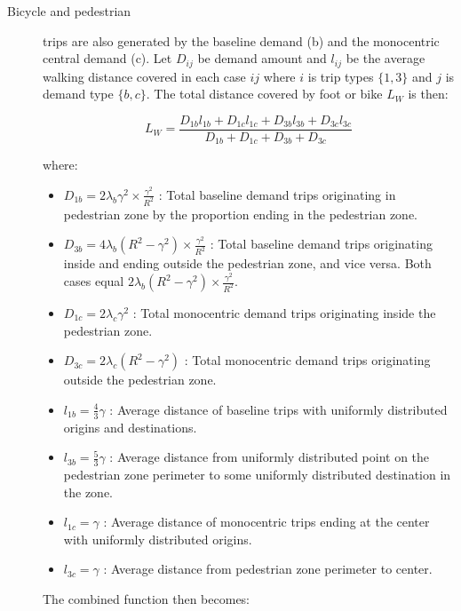 \documentclass{article}
\begin{document}
\begin{description}
    \item [Bicycle and pedestrian] trips are also generated by the baseline demand (b) and the monocentric central demand (c). Let $D_{ij}$ be demand amount and $l_{ij}$ be the average walking distance covered in each case $ij$ where $i$ is trip types $\{1,3\}$ and $j$ is demand type $\{b,c\}$. The total distance covered by foot or bike $L_W$ is then:

\begin{equation}
     L_W = \frac{ D_{1b}l_{1b} + D_{1c}l_{1c} + D_{3b}l_{3b} + D_{3c}l_{3c} } { D_{1b} + D_{1c} + D_{3b} + D_{3c} }
\end{equation}

where: 
\begin{itemize}
    \item $D_{1b} = 2 \lambda_b \gamma^2 \times \frac{\gamma^2}{R^2}$ : Total baseline demand trips originating in pedestrian zone by the proportion ending in the pedestrian zone.
    \item $D_{3b} = 4 \lambda_b (R^2 - \gamma^2) \times \frac{\gamma^2}{R^2}$ : Total baseline demand trips originating inside and ending outside the pedestrian zone, and vice versa. Both cases equal $2\lambda_b (R^2 - \gamma^2) \times \frac{\gamma^2}{R^2}$.
    \item $D_{1c} = 2 \lambda_c \gamma^2$ : Total monocentric demand trips originating inside the pedestrian zone.
    \item $D_{3c} = 2 \lambda_c (R^2 - \gamma^2)$ : Total monocentric demand trips originating outside the pedestrian zone.
    \item $l_{1b} = \frac{4}{3}\gamma$ : Average distance of baseline trips with uniformly distributed origins and destinations.
    \item $l_{3b} = \frac{5}{3}\gamma$ : Average distance from uniformly distributed point on the pedestrian zone perimeter to some uniformly distributed destination in the zone.
    \item $l_{1c} = \gamma$ : Average distance of monocentric trips ending at the center with uniformly distributed origins.
    \item $l_{3c} = \gamma$ : Average distance from pedestrian zone perimeter to center.
\end{itemize}

The combined function then becomes:



\end{description}
\end{document}
